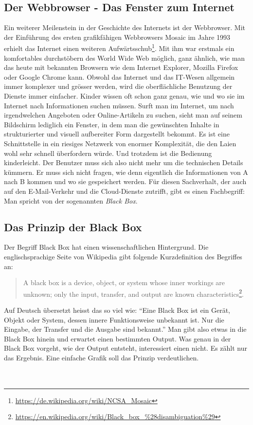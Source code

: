 \subsection{Der Webbrowser - Das Fenster zum Internet}
Ein weiterer Meilenstein in der Geschichte des Internets ist der Webbrowser. Mit der Einführung des ersten grafikfähigen Webbrowsers Mosaic im Jahre 1993 erhielt das Internet einen weiteren Aufwärtsschub\footnote{\url{https://de.wikipedia.org/wiki/NCSA_Mosaic}}.
Mit ihm war erstmals ein komfortables durchstöbern des World Wide Web möglich, ganz ähnlich, wie man das heute mit bekannten Browsern wie dem Internet Explorer, Mozilla Firefox oder Google Chrome kann. Obwohl das Internet und das IT-Wesen allgemein immer komplexer und grösser werden, wird die oberflächliche Benutzung der Dienste immer einfacher. Kinder wissen oft schon ganz genau, wie und wo sie im Internet nach Informationen suchen müssen. Surft man im Internet, um nach irgendwelchen Angeboten oder Online-Artikeln zu suchen, sieht man auf seinem Bildschirm lediglich ein Fenster, in dem man die gewünschten Inhalte in strukturierter und visuell aufbereiter Form dargestellt bekommt. Es ist eine Schnittstelle in ein riesiges Netzwerk von enormer Komplexität, die den Laien wohl sehr schnell überfordern würde. Und trotzdem ist die Bedienung kinderleicht. Der Benutzer muss sich also nicht mehr um die technischen Details kümmern. Er muss sich nicht fragen, wie denn eigentlich die Informationen von A nach B kommen und wo sie gespeichert werden. Für diesen Sachverhalt, der auch auf den E-Mail-Verkehr und die Cloud-Dienste zutrifft, gibt es einen Fachbegriff: Man spricht von der sogenannten \textit{Black Box}.

\subsection{Das Prinzip der Black Box}
Der Begriff Black Box hat einen wissenschaftlichen Hintergrund. Die englischsprachige Seite von Wikipedia gibt folgende Kurzdefinition des Begriffes an:

\begin{quote}
A black box is a device, object, or system whose inner workings are unknown; only the input, transfer, and output are known characteristics\footnote{\url{https://en.wikipedia.org/wiki/Black_box_\%28disambiguation\%29}}.
\end{quote}

Auf Deutsch übersetzt heisst das so viel wie: ``Eine Black Box ist ein Gerät, Objekt oder System, dessen innere Funktionsweise unbekannt ist. Nur die Eingabe, der Transfer und die Ausgabe sind bekannt.''
Man gibt also etwas in die Black Box hinein und erwartet einen bestimmten Output. Was genau in der Black Box vorgeht, wie der Output entsteht, interessiert einen nicht. Es zählt nur das Ergebnis. Eine einfache Grafik soll das Prinzip verdeutlichen. 
\\
\\
\\

